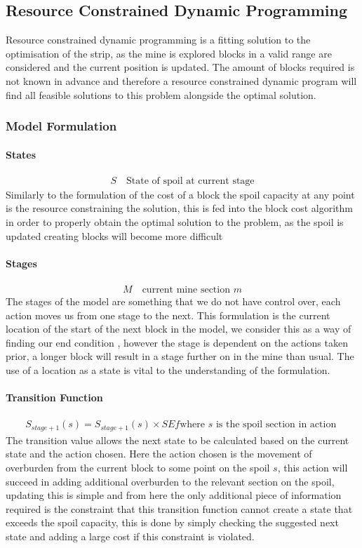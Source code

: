 \subsection{Resource Constrained Dynamic Programming}
Resource constrained dynamic programming is a fitting solution to the optimisation of the strip, as the mine is explored blocks in a valid range are considered and the current position is updated. The amount of blocks required is not known in advance and therefore a resource constrained dynamic program will find all feasible solutions to this problem alongside the optimal solution. 
\subsubsection{Model Formulation}
\paragraph*{States}
\begin{align}
\label{Stte}
S \quad \text{State of spoil at current stage}
\end{align}
Similarly to the formulation of the cost of a block the spoil capacity at any point is the resource constraining the solution, this is fed into the block cost algorithm in order to properly obtain the optimal solution to the problem, as the spoil is updated creating blocks will become more difficult 
\paragraph*{Stages}
\begin{align}
\label{DP:Stage0}
M \quad \text{current mine section }m 
\end{align}
The stages of the model are something that we do not have control over, each action moves us from one stage to the next. This formulation is the current location of the start of the next block in the model, we consider this as a way of finding our end condition , however the stage is dependent on the actions taken prior, a longer block will result in a stage further on in the mine than usual. The use of a location as a state is vital to the understanding of the formulation. 
\paragraph*{Transition Function}
\begin{align}
\label{Transition}
S_{stage+1}(s)=S_{stage+1}(s)\times SEf  \text{where $s$ is the spoil section in action }
\end{align}
The transition value allows the next state to be calculated based on the current state and the action chosen. Here the action chosen is the movement of overburden from the current block to some point on the spoil $s$, this action will succeed in adding additional overburden to the relevant section on the spoil, updating this is simple and from here the only additional piece of information required is the constraint that this transition function cannot create a state that exceeds the spoil capacity, this is done by simply checking the suggested next state and adding a large cost if this constraint is violated. 

